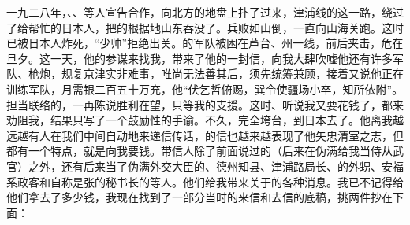 一九二八年，、、等人宣告合作，向北方的地盘上扑了过来，津浦线的这一路，绕过了给帮忙的日本人，把的根据地山东吞没了。兵败如山倒，一直向山海关跑。这时已被日本人炸死，“少帅”拒绝出关。的军队被困在芦台、州一线，前后夹击，危在旦夕。这一天，他的参谋来找我，带来了他的一封信，向我大肆吹嘘他还有许多军队、枪炮，规复京津实非难事，唯尚无法善其后，须先统筹兼顾，接着又说他正在训练军队，月需银二百五十万充，他“伏乞哲俯赐，巽令使疆场小卒，知所依附”。担当联络的，一再陈说胜利在望，只等我的支援。这时、听说我又要花钱了，都来劝阻我，结果只写了一个鼓励性的手谕。不久，完全垮台，到日本去了。他离我越远越有人在我们中间自动地来递信传话，的信也越来越表现了他矢忠清室之志，但都有一个特点，就是向我要钱。带信人除了前面说过的（后来在伪满给我当侍从武官）之外，还有后来当了伪满外交大臣的、德州知县、津浦路局长、的外甥、安福系政客和自称是张的秘书长的等人。他们给我带来关于的各种消息。我已不记得给他们拿去了多少钱，我现在找到了一部分当时的来信和去信的底稿，挑两件抄在下面：\\

